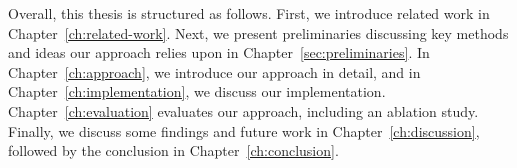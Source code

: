 Overall, this thesis is structured as follows. First, we introduce related work in Chapter~\ref{ch:related-work}. 
Next, we present preliminaries discussing key methods and ideas our approach relies upon in Chapter~\ref{sec:preliminaries}. In Chapter~\ref{ch:approach}, we introduce our approach in detail, and in Chapter~\ref{ch:implementation}, we discuss our implementation.
Chapter~\ref{ch:evaluation} evaluates our approach, including an ablation study. Finally, we discuss some findings and future work in Chapter~\ref{ch:discussion}, followed by the conclusion in Chapter~\ref{ch:conclusion}.

